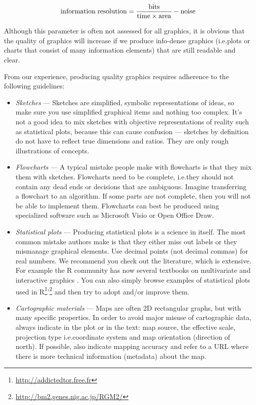 \documentclass[graybox,envcountchap,sectrefs,UStrade]{svmono}
\begin{document}
\begin{equation}\label{E:info.res}
    {\rm information} \; {\rm resolution} = \frac{{\rm bits}}{{\rm time} \times {\rm area}} - {\rm noise}
\end{equation}

Although this parameter is often not assessed for all graphics, it is obvious that the quality of graphics will increase if we produce info-dense graphics (i.e.\@ plots or charts that consist of many information elements) that are still readable and clear.\par

From our experience, producing quality graphics requires adherence to the following guidelines:

\begin{itemize}
  \item \emph{Sketches} --- Sketches are simplified, symbolic representations of ideas, so make sure you use simplified graphical items and nothing too complex. It's not a good idea to mix sketches with objective representations of reality such as statistical plots, because this can cause confusion --- sketches by definition do not have to reflect true dimensions and ratios. They are only rough illustrations of concepts.
  \item \emph{Flowcharts} --- A typical mistake people make with flowcharts is that they mix them with sketches. Flowcharts need to be complete, i.e.\@ they should not contain any dead ends or decisions that are ambiguous. Imagine transferring a flowchart to an algorithm. If some parts are not complete, then you will not be able to implement them. Flowcharts can best be produced using specialized software such as Microsoft \textsf{Visio} or Open Office Draw.
  \item \emph{Statistical plots} --- Producing statistical plots is a science in itself. The most common mistake authors make is that they either miss out labels or they mismanage graphical elements. Use decimal points (not decimal commas) for real numbers. We recommend you check out the literature, which is extensive. For example the \textsf{R} community has now several textbooks on multivariate \citep{Sarkar2008,Wickham2009} and interactive graphics \citep{Theus2008}. You can also simply browse examples of statistical plots used in \textsf{R}\footnote{\url{http://addictedtor.free.fr}}'\footnote{\url{http://bm2.genes.nig.ac.jp/RGM2/}} and then try to adopt and/or improve them.
  \item \emph{Cartographic materials} --- Maps are often 2D rectangular graphs, but with many specific properties. In order to avoid major misuse of cartographic data, always indicate in the plot or in the text: map source, the effective scale, projection type i.e.\@ coordinate system and map orientation (direction of north). If possible, also indicate mapping accuracy and refer to a URL where there is more technical information (metadata) about the map.

\end{itemize}
\end{document}
